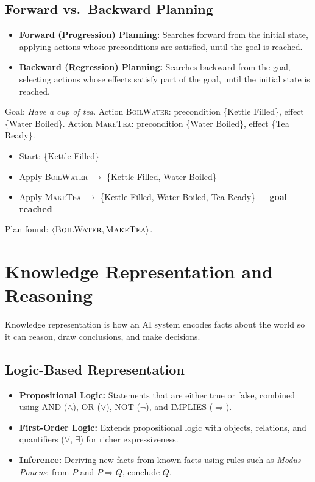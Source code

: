 \documentclass[11pt,a4paper]{article}
\begin{document}
\subsection{Forward vs.\ Backward Planning}
\begin{itemize}[leftmargin=*]
  \item \textbf{Forward (Progression) Planning:} Searches forward from the initial state, applying actions whose preconditions are satisfied, until the goal is reached.
  \item \textbf{Backward (Regression) Planning:} Searches backward from the goal, selecting actions whose effects satisfy part of the goal, until the initial state is reached.
\end{itemize}

\begin{examplebox}
Goal: \textit{Have a cup of tea}. Action \textsc{BoilWater}: precondition \{Kettle Filled\}, effect \{Water Boiled\}. Action \textsc{MakeTea}: precondition \{Water Boiled\}, effect \{Tea Ready\}.
\begin{itemize}[leftmargin=*]
  \item Start: \{Kettle Filled\}
  \item Apply \textsc{BoilWater} $\to$ \{Kettle Filled, Water Boiled\}
  \item Apply \textsc{MakeTea} $\to$ \{Kettle Filled, Water Boiled, Tea Ready\} --- \textbf{goal reached}
\end{itemize}
Plan found: $\langle \textsc{BoilWater}, \textsc{MakeTea} \rangle$.
\end{examplebox}

\section{Knowledge Representation and Reasoning}

\begin{definitionbox}
Knowledge representation is how an AI system encodes facts about the world so it can reason, draw conclusions, and make decisions.
\end{definitionbox}

\subsection{Logic-Based Representation}
\begin{itemize}[leftmargin=*]
  \item \textbf{Propositional Logic:} Statements that are either true or false, combined using AND ($\land$), OR ($\lor$), NOT ($\lnot$), and IMPLIES ($\Rightarrow$).
  \item \textbf{First-Order Logic:} Extends propositional logic with objects, relations, and quantifiers ($\forall$, $\exists$) for richer expressiveness.
  \item \textbf{Inference:} Deriving new facts from known facts using rules such as \emph{Modus Ponens}: from $P$ and $P \Rightarrow Q$, conclude $Q$.
\end{itemize}
\end{document}
